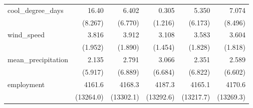\begin{table}[htbp]
\begin{tabular}{l*{5}{D{.}{.}{-1}}}
\addlinespace
cool\_degree\_days    &       16.40&       6.402&       0.305&       5.350&       7.074\\
                    &     (8.267)&     (6.770)&     (1.216)&     (6.173)&     (8.496)\\
\addlinespace
wind\_speed          &       3.816&       3.912&       3.108&       3.583&       3.604\\
                    &     (1.952)&     (1.890)&     (1.454)&     (1.828)&     (1.818)\\
\addlinespace
mean\_precipitation  &       2.135&       2.791&       3.066&       2.351&       2.589\\
                    &     (5.917)&     (6.889)&     (6.684)&     (6.822)&     (6.602)\\
\addlinespace
employment          &      4161.6&      4168.3&      4187.3&      4165.1&      4170.6\\
                    &   (13264.0)&   (13302.1)&   (13292.6)&   (13217.7)&   (13269.3)\\
\bottomrule
\end{tabular}
\end{table}
